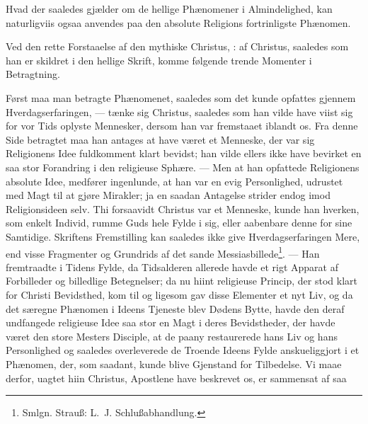 \documentclass[12pt]{book}
\newcommand{\dsi}{\reflectbox{c}:}
\newcommand{\opage}[1]{\marginnote{\footnotesize\textit{[#1]}}}
\begin{document}
Hvad der saaledes gjælder om de hellige Phænomener i Almindelighed, kan
naturligviis ogsaa anvendes paa den absolute Religions fortrinligste Phænomen.

Ved den rette Forstaaelse af den mythiske Christus, \dsi{} af Christus, saaledes
som han er skildret i den hellige Skrift, komme følgende trende Momenter i
Betragtning.

Først maa man betragte Phænomenet, saaledes som det kunde opfattes gjennem
Hverdagserfaringen, --- tænke sig Christus, saaledes som han vilde have viist
sig for vor Tids oplyste Mennesker, dersom han var fremstaaet iblandt os. Fra
denne Side betragtet maa han antages at have været et Menneske, der var sig
Religionens Idee fuldkomment klart bevidst; han vilde ellers ikke have bevirket
en saa stor Forandring i den religieuse Sphære. --- Men at han opfattede
Religionens absolute Idee, medfører ingenlunde, at han var en evig Personlighed,
udrustet med Magt til at gjøre Mirakler; ja en saadan Antagelse strider endog
imod Religionsideen selv. Thi forsaavidt Christus var et Menneske, kunde han
hverken, som enkelt Individ, rumme Guds hele Fylde i sig, eller aabenbare denne
for sine Samtidige. Skriftens Fremstilling kan
\opage{134} \setcounter{footnote}{0}%
saaledes ikke give Hverdagserfaringen Mere, end visse Fragmenter og Grundrids af
det sande Messiasbillede\footnote{Smlgn. Strauß: L.~J. Schlußabhandlung.}. ---
Han fremtraadte i Tidens Fylde, da Tidsalderen allerede havde et rigt Apparat af
Forbilleder og billedlige Betegnelser; da nu hiint religieuse Princip, der stod
klart for Christi Bevidsthed, kom til og ligesom gav disse Elementer et nyt Liv,
og da det særegne Phænomen i Ideens Tjeneste blev Dødens Bytte, havde den deraf
undfangede religieuse Idee saa stor en Magt i deres Bevidstheder, der havde
været den store Mesters Disciple, at de paany restaurerede hans Liv og hans
Personlighed og saaledes overleverede de Troende Ideens Fylde anskueliggjort i
et Phænomen, der, som saadant, kunde blive Gjenstand for Tilbedelse. Vi maae
derfor, uagtet hiin Christus, Apostlene have beskrevet os, er sammensat af saa
\end{document}
